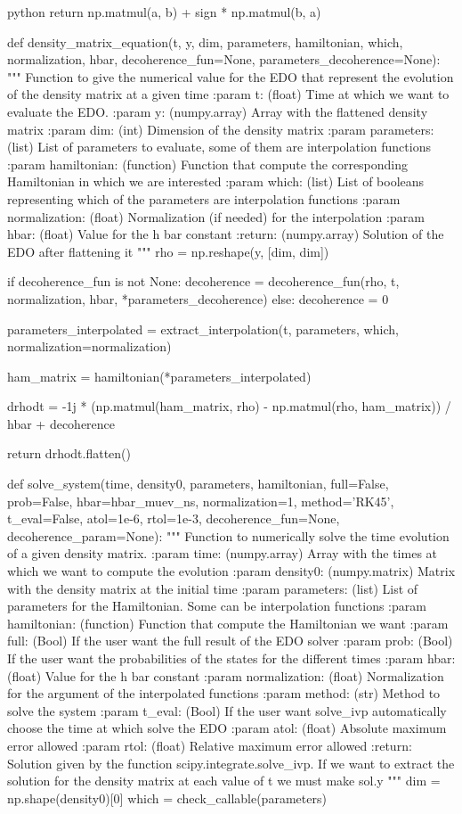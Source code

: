 \begin{mintedbox}{python}
	return np.matmul(a, b) + sign * np.matmul(b, a)
	
def density_matrix_equation(t, y, dim, parameters, hamiltonian, which, normalization, hbar, decoherence_fun=None, parameters_decoherence=None):
	"""
	Function to give the numerical value for the EDO that represent the evolution of the density matrix at a given time
	:param t: (float) Time at which we want to evaluate the EDO.
	:param y:  (numpy.array) Array with the flattened density matrix
	:param dim: (int) Dimension of the density matrix
	:param parameters: (list) List of parameters to evaluate, some of them are interpolation functions
	:param hamiltonian: (function) Function that compute the corresponding Hamiltonian in which we are interested
	:param which: (list) List of booleans representing which of the parameters are interpolation functions
	:param normalization: (float) Normalization (if needed) for the interpolation
	:param hbar: (float) Value for the h bar constant
	:return: (numpy.array) Solution of the EDO after flattening it
	"""
	rho = np.reshape(y, [dim, dim])

	if decoherence_fun is not None:
		decoherence = decoherence_fun(rho, t, normalization, hbar, *parameters_decoherence)
	else:
		decoherence = 0

	parameters_interpolated = extract_interpolation(t, parameters, which, normalization=normalization)

	ham_matrix = hamiltonian(*parameters_interpolated)
	
	drhodt = -1j * (np.matmul(ham_matrix, rho) - np.matmul(rho, ham_matrix)) / hbar + decoherence
	
	return drhodt.flatten()
	
def solve_system(time, density0, parameters, hamiltonian, full=False, prob=False, hbar=hbar_muev_ns, normalization=1, method='RK45', t_eval=False,
atol=1e-6, rtol=1e-3, decoherence_fun=None, decoherence_param=None):
	"""
	Function to numerically solve the time evolution of a given density matrix.
	:param time: (numpy.array) Array with the times at which we want to compute the evolution
	:param density0: (numpy.matrix) Matrix with the density matrix at the initial time
	:param parameters: (list) List of parameters for the Hamiltonian. Some can be interpolation functions
	:param hamiltonian: (function) Function that compute the Hamiltonian we want
	:param full: (Bool) If the user want the full result of the EDO solver
	:param prob: (Bool) If the user want the probabilities of the states for the different times
	:param hbar: (float) Value for the h bar constant
	:param normalization: (float) Normalization for the argument of the interpolated functions
	:param method: (str) Method to solve the system
	:param t_eval: (Bool) If the user want solve_ivp automatically choose the time at which solve the EDO
	:param atol: (float) Absolute maximum error allowed
	:param rtol: (float) Relative maximum error allowed
	:return: Solution given by the function scipy.integrate.solve_ivp. If we want to extract the solution for the density matrix at each value of t
	we must make sol.y
	"""
	dim = np.shape(density0)[0]
	which = check_callable(parameters)


\end{mintedbox}
